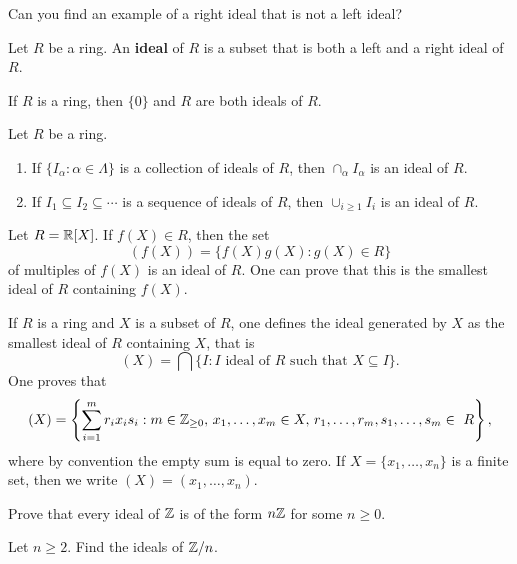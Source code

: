 Can you find an 
example of a right ideal that is not a left ideal?

\begin{definition}
Let $R$ be a ring. An \textbf{ideal} of $R$ is a subset that is both a left and a right ideal of $R$. 
\end{definition}
 
If $R$ is a ring, then $\{0\}$ and $R$ are both ideals of $R$. 

\begin{exercise}
Let $R$ be a ring. 
\begin{enumerate}
\item If $\{I_\alpha:\alpha\in\Lambda\}$ is a collection of ideals of $R$, then $\cap_{\alpha}I_\alpha$ is an ideal of $R$.  	
\item If $I_1\subseteq I_2\subseteq\cdots$ is a sequence of ideals of $R$, then $\cup_{i\geq1}I_i$ is an ideal of $R$. 
\end{enumerate}
\end{exercise}

\begin{example}
Let $R=\mathbb{R}[X]$. If $f(X)\in R$, then the set 
\[
(f(X))=\{f(X)g(X):g(X)\in R\}
\]
of multiples of $f(X)$ is an ideal of $R$. One can prove that this is the smallest 
ideal of $R$ containing $f(X)$.  	
\end{example}


If $R$ is a ring and $X$ is a subset of $R$, one defines
the ideal generated by $X$ as the smallest ideal of $R$ containing $X$, that is 
\[
(X)=\bigcap\{I:\text{$I$ ideal of $R$ such that $X\subseteq I$}\}.
\]
One proves that 
\[
(X)=\left\{\sum_{i=1}^mr_ix_is_i:m\in\Z_{\geq0},\,x_1,\dots,x_m\in X,\,r_1,\dots,r_m,s_1,\dots,s_m\in R\right\}, 
\]
where by convention the empty sum is equal to zero. If $X=\{x_1,\dots,x_n\}$ is a finite
set, then we write $(X)=(x_1,\dots,x_n)$. 

\begin{exercise}
\label{xca:ideals_Z}
Prove that every ideal of $\mathbb{Z}$ is of the form $n\mathbb{Z}$ for some $n\geq0$. 	
\end{exercise}

\begin{exercise}
Let $n\geq2$. Find the ideals of $\mathbb{Z}/n$. 	
\end{exercise}

